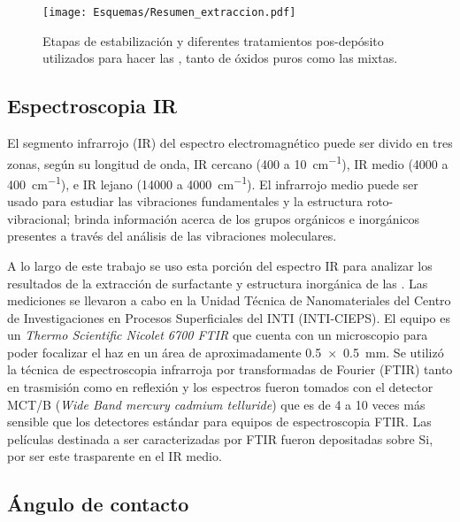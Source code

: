 				\begin{figure}[ht!]
						  \begin{center}
						  \texttt{[image: Esquemas/Resumen\_extraccion.pdf]}
						  \caption[Tratamientos pos-depósito de \pdm]{Etapas de estabilización y diferentes tratamientos pos-depósito utilizados para hacer las \pdm, tanto de óxidos puros como las mixtas.}
						  \label{esq:peliculas_meso_tratamientos}
						  \end{center}
						  \end{figure}

	\subsection{Espectroscopia IR}\label{sec:IR}

		El segmento infrarrojo (IR) del espectro electromagnético puede ser divido en tres zonas, según su longitud de onda, IR cercano (400 a \SI{10}{\cm^{-1}}), IR medio (4000 a \SI{400}{\cm^{-1}}), e IR lejano (14000 a \SI{4000}{\cm^{-1}}). El infrarrojo medio puede ser usado para estudiar las vibraciones fundamentales y la estructura roto-vibracional; brinda información acerca de los grupos orgánicos e inorgánicos  presentes a través del análisis de las vibraciones moleculares.\cite{Atkins2006,Barrow1962,Stuart2004} 
		
		A lo largo de este trabajo se uso esta porción del espectro IR para analizar los resultados de la extracción de surfactante y estructura inorgánica de las \pdm. Las mediciones se llevaron a cabo en la Unidad Técnica de Nanomateriales del Centro de Investigaciones en Procesos Superficiales del INTI (INTI-CIEPS). El equipo es un \textit{Thermo Scientific Nicolet 6700 FTIR} que cuenta con un microscopio para poder focalizar el haz en un área de aproximadamente \SI{0.5x0.5}{\mm}. Se utilizó la técnica de espectroscopia infrarroja por transformadas de Fourier (FTIR) tanto en trasmisión como en reflexión y los espectros fueron tomados con el detector MCT/B (\textit{Wide Band mercury cadmium telluride}) que es de 4 a 10 veces más sensible que los detectores estándar para equipos de espectroscopia FTIR.\cite{Nicholet2007} Las películas destinada a ser caracterizadas por FTIR fueron depositadas sobre Si, por ser este trasparente en el IR medio.

	\subsection{Ángulo de contacto}

